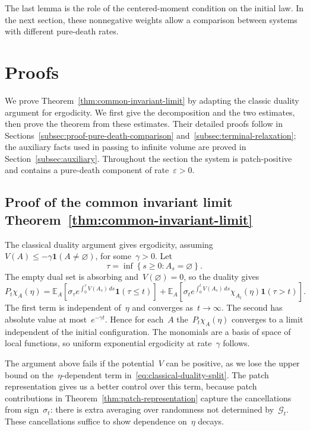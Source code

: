 \documentclass[EJP,preprint,NODS,nobera]{ejpecp}
\newcommand{\E}{\mathbb{E}}
\newcommand{\bb}[1]{\left(#1\right)}
\newcommand{\Cb}[1]{\left[#1\right]}
\newcommand{\cb}[1]{\left\{#1\right\}}
\newcommand{\ind}{\mathbf{1}}
\newcommand{\vn}{\varnothing}
\begin{document}
{\color{red}
The last lemma is the role of the centered-moment condition on the initial law. In the next section, these nonnegative weights allow a comparison between systems with different pure-death rates.
}

\section{Proofs}
\label{sec:proofs}

{\color{red}
We prove Theorem~\ref{thm:common-invariant-limit} by adapting the classic
duality argument for ergodicity. We first give the decomposition and the two
estimates, then prove the theorem from these estimates. Their detailed proofs follow in
Sections~\ref{subsec:proof-pure-death-comparison}
and~\ref{subsec:terminal-relaxation}; the auxiliary facts used in passing to
infinite volume are proved in Section~\ref{subsec:auxiliary}.
Throughout the section the system is patch-positive and contains a pure-death
component of rate~$\varepsilon>0$.
}

\subsection{Proof of the common invariant limit Theorem~\ref{thm:common-invariant-limit}}
\label{subsec:duality-proof-plan}
\label{subsec:proof-common-invariant-limit}
\label{subsec:infinite-volume-proof}
\label{subsec:proofs-main}

The classical duality argument gives ergodicity, assuming~$V(A)\leq -\gamma\ind\bb{A\neq\vn}$, for some~$\gamma>0$. Let
\begin{equation*}
\tau=\inf\cb{s\geq0:A_s=\vn}.
\end{equation*}
The empty dual set is absorbing and~$V(\vn)=0$, so the duality gives
\begin{equation}
P_t\chi_A(\eta)
=
\E_A\Cb{\sigma_\tau
 e^{\int_0^\tau V(A_s)\,ds}\ind\bb{\tau\leq t}}
+\E_A\Cb{\sigma_t
 e^{\int_0^t V(A_s)\,ds}\chi_{A_t}(\eta)
 \ind\bb{\tau>t}}.
\label{eq:classical-duality-split}
\end{equation}
The first term is independent of~$\eta$ and converges as~$t\to\infty$. The second has absolute value at most~$e^{-\gamma t}$. Hence for each~$A$ the~$P_t\chi_A(\eta)$ converges to a limit independent of the initial configuration. The monomials are a basis of space of local functions, so uniform exponential ergodicity at rate~$\gamma$ follows.


The argument above fails if the potential~$V$ can be positive, as we lose the upper bound on the~$\eta$-dependent term in~\eqref{eq:classical-duality-split}. The patch representation gives us a better control over this term, because patch contributions in Theorem~\ref{thm:patch-representation} capture the cancellations from sign~$\sigma_t$: there is extra averaging over randomness not determined by~$\mathcal{G}_t$. These cancellations suffice to show dependence on~$\eta$ decays.
\end{document}
